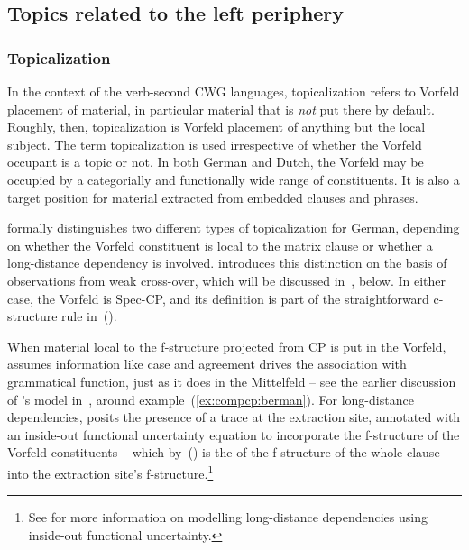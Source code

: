 \documentclass[output=paper,hidelinks]{langscibook}
\begin{document}
\subsection{Topics related to the left periphery\label{sec:Germanic:leftperi}}

\subsubsection{Topicalization\label{sec:Germanic:top}}

In the context of the verb-second CWG languages, 
topicalization refers to Vorfeld placement of material, in particular material
that is \textit{not} put there by default. Roughly, then,
topicalization is Vorfeld placement of anything but the local
subject. The term topicalization is used irrespective of whether the
Vorfeld occupant is a topic or not.  In both German and Dutch, the
Vorfeld may be occupied by a categorially and functionally wide range
of constituents. It is also a target position for material extracted
from embedded clauses and phrases.

\citet[Chapter 6]{Berman2003} formally distinguishes two different
types of topicalization for German, depending on whether the Vorfeld
constituent is local to the matrix clause or whether a long-distance
dependency is involved. \citeauthor{Berman2003} introduces this
distinction on the basis of observations from weak cross-over, which
will be discussed in~, below. In either case,
the Vorfeld is Spec-CP, and its definition is part of the
straightforward c-structure rule in~().

\begin{exe}
  \ex {}
\end{exe}
%
When material local to the f-structure projected from CP is put in the
Vorfeld, \citeauthor{Berman2003} assumes information like case and
agreement drives the association with grammatical function, just as it
does in the Mittelfeld -- see the earlier discussion of
\citeauthor{Berman2003}'s model in~, around
example~(\ref{ex:compcp:berman}). For long-distance dependencies,
\citeauthor{Berman2003} posits the presence of a trace at the
extraction site, annotated with an inside-out functional uncertainty
equation to incorporate the f-structure of the Vorfeld constituents --
which by~() is the \DF of the f-structure of the whole clause -- 
into the extraction site's f-structure.\footnote{See
 for more
information on modelling long-distance dependencies using inside-out
functional uncertainty.}
\end{document}
